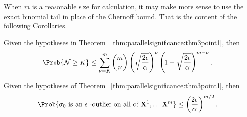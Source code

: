 \documentclass[12pt]{article}
\begin{document}
\begin{remark}
    When \( m \) is a reasonable size for calculation, it may make more
    sense to use the exact binomial tail in place of the Chernoff bound.
    That is the content of the following Corollaries.
\end{remark}

\begin{corollary}
    Given the hypotheses in Theorem~%
    \ref{thm:parallelsignificance:thm3point1}, then
    \[
        \Prob{\mathcal{N} \ge K} \le \sum\limits_{\nu=K}^m \binom{m}{\nu}
        \left( \sqrt{\frac{2\epsilon}{\alpha}} \right)^{\nu} \left( 1 -
        \sqrt{\frac{2\epsilon}{\alpha}} \right)^{m-\nu}.
    \]
\end{corollary}

\begin{corollary}
    \label{cor:parallelsignificance:cor32} Given the hypotheses of
    Theorem~%
    \ref{thm:parallelsignificance:thm3point1}, then
    \[
        \Prob{\sigma_0 \text{ is an \( \epsilon \) -outlier on all of }
        \mathbf {X}^1, \dots \mathbf{X}^m } \le \left( \frac{2\epsilon}{\alpha}
        \right)^{m/2}.
    \]
\end{corollary}

\end{document}
